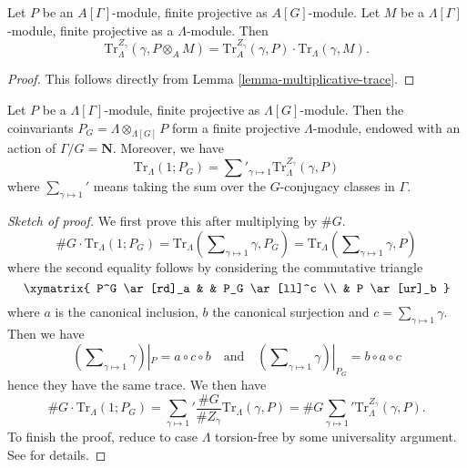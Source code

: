 \begin{lemma}
\label{lemma-weak-trace}
Let $P$ be an $A[\Gamma]$-module, finite projective as $A[G]$-module. Let $M$
be a $\Lambda[\Gamma]$-module, finite projective as a $\Lambda$-module. Then
$$
\text{Tr}_{\Lambda}^{Z_\gamma}(\gamma, P \otimes_A M) =
\text{Tr}_A^{Z_\gamma}(\gamma, P)\cdot \text{Tr}_\Lambda(\gamma, M).
$$
\end{lemma}

\begin{proof}
This follows directly from Lemma \ref{lemma-multiplicative-trace}.
\end{proof}

\begin{lemma}
\label{lemma-trivial-trace}
Let $P$ be a $\Lambda[\Gamma]$-module, finite projective as
$\Lambda[G]$-module. Then the coinvariants
$P_G = \Lambda \otimes_{\Lambda[G]} P$
form a finite projective $\Lambda$-module, endowed with an action of
$\Gamma/G = \mathbf{N}$. Moreover, we have
$$
\text{Tr}_\Lambda(1; P_G) =
\sum\nolimits'_{\gamma \mapsto 1} \text{Tr}_\Lambda^{Z_\gamma}(\gamma, P)
$$
where $\sum_{\gamma\mapsto 1}'$ means taking the sum over the $G$-conjugacy
classes in $\Gamma$.
\end{lemma}

\begin{proof}[Sketch of proof]
We first prove this after multiplying by $\# G$.
$$
\# G\cdot \text{Tr}_\Lambda(1; P_G)
= \text{Tr}_\Lambda(\sum\nolimits_{\gamma\mapsto 1} \gamma, P_G)
= \text{Tr}_\Lambda(\sum\nolimits_{\gamma\mapsto 1} \gamma, P)
$$
where the second equality follows by considering the commutative triangle
$$
\xymatrix{
P^G \ar[rd]_a & & P_G \ar[ll]^c \\
& P \ar[ur]_b
}
$$
where $a$ is the canonical inclusion, $b$ the canonical surjection and $c =
\sum_{\gamma \mapsto 1} \gamma$. Then we have
$$
(\sum\nolimits_{\gamma \mapsto 1} \gamma) |_P = a \circ c \circ b
\quad\text{and}\quad
(\sum\nolimits_{\gamma \mapsto 1} \gamma) |_{P_G} = b \circ a \circ c
$$
hence they have the same trace. We then have
$$
\# G\cdot \text{Tr}_\Lambda(1; P_G)
=
{\sum_{\gamma\mapsto 1}}'
\frac{\# G}{\# Z_\gamma}\text{Tr}_\Lambda(\gamma, P)
= \# G{\sum_{\gamma\mapsto 1}}' \text{Tr}_\Lambda^{Z_\gamma}(\gamma, P).
$$
To finish the proof, reduce to case $\Lambda$ torsion-free by some universality
argument. See \cite{SGA4.5} for details.
\end{proof}

